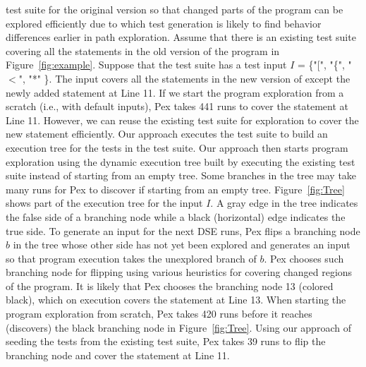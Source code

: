 test suite for the original version so that changed parts of the program can be explored
efficiently due to which test generation is likely to find behavior
differences earlier in path exploration. Assume that there is an existing test suite covering all the statements in the old version of the program in Figure~\ref{fig:example}. Suppose that the test suite has a test input $I$ = \{"[", "\{", "$<$", "*" \}. The input covers all the statements in the new version of  except the newly added statement at Line 11. If we start the program exploration from a scratch (i.e., with default inputs), Pex takes 441 runs to cover the statement at Line 11. However, we can reuse the existing test suite for exploration to cover the new statement efficiently. Our approach executes the test suite to build an execution tree for the tests in the test suite. Our approach then starts program exploration using the dynamic execution tree built by executing the existing test suite instead of starting from an empty tree. Some branches in the tree may take many runs for Pex to discover if starting from an empty tree. Figure~\ref{fig:Tree} shows part of the execution tree for the input $I$. A gray edge in the tree indicates the false side of a branching node while a black (horizontal) edge indicates the true side. To generate an input for the next DSE runs, Pex flips a branching node $b$ in the tree whose other side has not yet been explored and generates an input so that program execution takes the unexplored branch of $b$. Pex chooses such branching node for flipping using various heuristics for covering changed regions of the program. It is likely that Pex chooses the branching node 13 (colored black), which on execution covers the  statement at Line 13. When starting the program exploration from scratch, Pex takes 420 runs before it reaches (discovers) the black branching node in Figure~\ref{fig:Tree}. Using our approach of seeding the tests from the existing test suite, Pex takes 39 runs to flip the branching node and cover the statement at Line 11.









